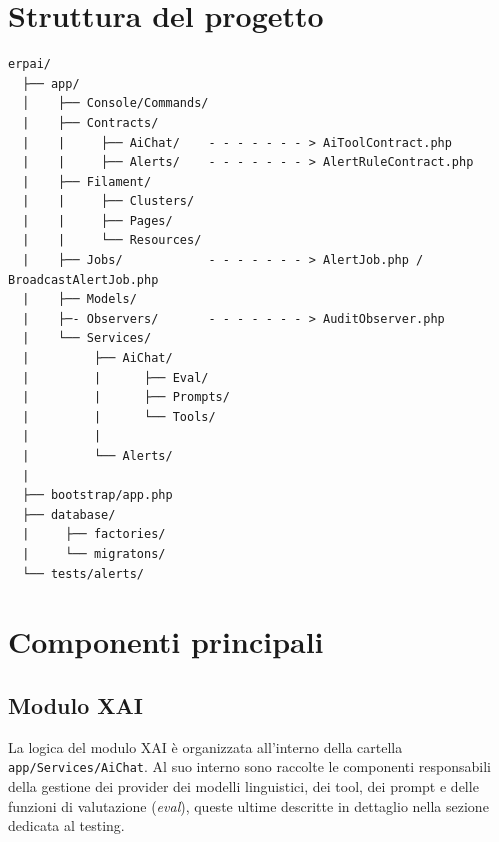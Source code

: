 \newpage
\section{Struttura del progetto}
\begin{listing}[H]
\begin{verbatim}
erpai/
  ├── app/
  │    ├── Console/Commands/
  |    ├── Contracts/
  |    |     ├── AiChat/    - - - - - - - > AiToolContract.php       
  |    |     ├── Alerts/    - - - - - - - > AlertRuleContract.php 
  |    ├── Filament/
  |    |     ├── Clusters/
  |    |     ├── Pages/
  |    |     └── Resources/
  |    ├── Jobs/            - - - - - - - > AlertJob.php / BroadcastAlertJob.php
  |    ├── Models/ 
  |    ├─- Observers/       - - - - - - - > AuditObserver.php
  |    └── Services/
  |         ├── AiChat/
  |         |      ├── Eval/
  |         |      ├── Prompts/
  |         |      └── Tools/
  |         |      
  |         └── Alerts/
  |
  ├── bootstrap/app.php
  ├── database/
  |     ├── factories/
  |     └── migratons/
  └── tests/alerts/
\end{verbatim}
\caption{Struttura del progetto}
\label{listing:folders}
\end{listing}

\section{Componenti principali}
\subsection{Modulo XAI}
La logica del modulo XAI è organizzata all'interno della cartella \newline\texttt{app/Services/AiChat}. Al suo interno sono raccolte le componenti responsabili della gestione 
dei provider dei modelli linguistici, dei tool, dei prompt e delle funzioni di valutazione (\textit{eval}), queste ultime descritte in dettaglio nella sezione dedicata al 
testing.

